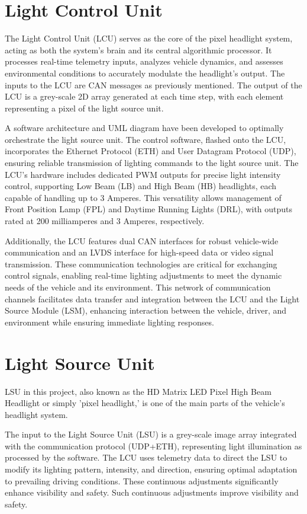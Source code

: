 \section{Light Control Unit}
The Light Control Unit (LCU) serves as the core of the pixel headlight system, acting as both the system's brain and its central algorithmic processor. It processes real-time telemetry inputs, analyzes vehicle dynamics, and assesses environmental conditions to accurately modulate the headlight's output. The inputs to the LCU are CAN messages as previously mentioned. The output of the LCU is a grey-scale 2D array generated at each time step, with each element representing a pixel of the light source unit.

A software architecture and  UML diagram have been developed to optimally orchestrate the light source unit. The control software, flashed onto the LCU, incorporates the Ethernet Protocol (ETH) and User Datagram Protocol (UDP), ensuring reliable transmission of lighting commands to the light source unit.
The LCU's hardware includes dedicated PWM outputs for precise light intensity control, supporting Low Beam (LB) and High Beam (HB) headlights, each capable of handling up to 3 Amperes. This versatility allows management of Front Position Lamp (FPL) and Daytime Running Lights (DRL), with outputs rated at 200 milliamperes and 3 Amperes, respectively.

Additionally, the LCU features dual CAN interfaces for robust vehicle-wide communication and an LVDS interface for high-speed data or video signal transmission. These communication technologies are critical for exchanging control signals, enabling real-time lighting adjustments to meet the dynamic needs of the vehicle and its environment. This network of communication channels facilitates data transfer and integration between the LCU and the Light Source Module (LSM), enhancing interaction between the vehicle, driver, and environment while ensuring immediate lighting responses.

\section{Light Source Unit}
LSU in this project, also known as the HD Matrix LED Pixel
High Beam Headlight or simply 'pixel headlight,' is one of the main parts of the
vehicle's headlight system.

The input to the Light Source Unit (LSU) is a grey-scale image array integrated with the communication protocol (UDP+ETH), representing light illumination as processed by the software. The LCU uses telemetry data to direct the LSU to modify its lighting pattern, intensity, and direction, ensuring optimal adaptation to prevailing driving conditions. These continuous adjustments significantly enhance visibility and safety. Such continuous adjustments improve visibility and safety.

